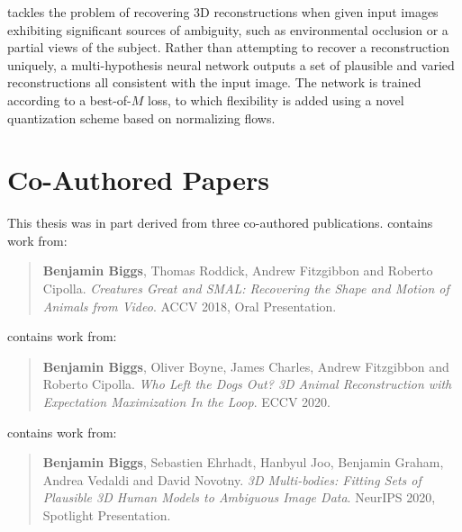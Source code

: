  tackles the problem of recovering 3D reconstructions when given input images exhibiting significant sources of ambiguity, such as environmental occlusion or a partial views of the subject. Rather than attempting to recover a reconstruction uniquely, a multi-hypothesis neural network outputs a set of plausible and varied reconstructions all consistent with the input image. The network is trained according to a best-of-$M$ loss, to which flexibility is added using a novel quantization scheme based on normalizing flows. 

\section{Co-Authored Papers}  %

This thesis was in part derived from three co-authored publications.  contains work from:

\begin{quote}
    \textbf{Benjamin Biggs}, Thomas Roddick, Andrew Fitzgibbon and Roberto Cipolla. \emph{Creatures Great and SMAL: Recovering the Shape and Motion of Animals from Video}. ACCV 2018, Oral Presentation.
\end{quote}

\noindent{} contains work from:

\begin{quote}
    \textbf{Benjamin Biggs}, Oliver Boyne, James Charles, Andrew Fitzgibbon and Roberto Cipolla. \emph{Who Left the Dogs Out? 3D Animal Reconstruction with Expectation Maximization In the Loop}. ECCV 2020.
\end{quote}

\noindent
{} contains work from:

\begin{quote}
    \textbf{Benjamin Biggs}, Sebastien Ehrhadt, Hanbyul Joo, Benjamin Graham, Andrea Vedaldi and David Novotny. \emph{3D Multi-bodies: Fitting Sets of Plausible 3D Human Models to Ambiguous Image Data}. NeurIPS 2020, Spotlight Presentation.
\end{quote}